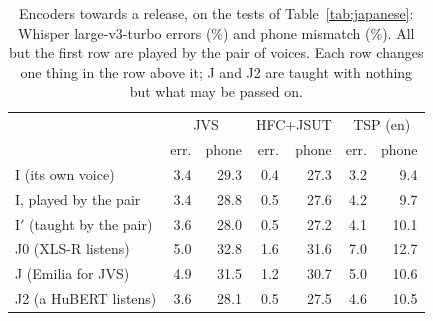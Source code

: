 \documentclass[10pt,a4paper,twocolumn]{article}
\begin{document}
\begin{table}[t]
\centering\footnotesize\setlength{\tabcolsep}{2.6pt}
\caption{Encoders towards a release, on the tests of Table~\ref{tab:japanese}: Whisper
large-v3-turbo errors (\%) and phone mismatch (\%). All but the first row are played by the pair
of voices. Each row changes one thing in the row above it; J and J2 are taught with nothing
but what may be passed on.}
\label{tab:release}
\begin{tabular}{@{}lrrrrrr@{}}
\toprule
& \multicolumn{2}{c}{JVS} & \multicolumn{2}{c}{HFC+JSUT} & \multicolumn{2}{c}{TSP (en)}\\
& err. & phone & err. & phone & err. & phone\\
\midrule
I (its own voice) & 3.4 & 29.3 & 0.4 & 27.3 & 3.2 & 9.4\\
I, played by the pair & 3.4 & 28.8 & 0.5 & 27.6 & 4.2 & 9.7\\
I$'$ (taught by the pair) & 3.6 & 28.0 & 0.5 & 27.2 & 4.1 & 10.1\\
J0 (XLS-R listens) & 5.0 & 32.8 & 1.6 & 31.6 & 7.0 & 12.7\\
J (Emilia for JVS) & 4.9 & 31.5 & 1.2 & 30.7 & 5.0 & 10.6\\
J2 (a HuBERT listens) & 3.6 & 28.1 & 0.5 & 27.5 & 4.6 & 10.5\\
\bottomrule
\end{tabular}
\end{table}
\end{document}
